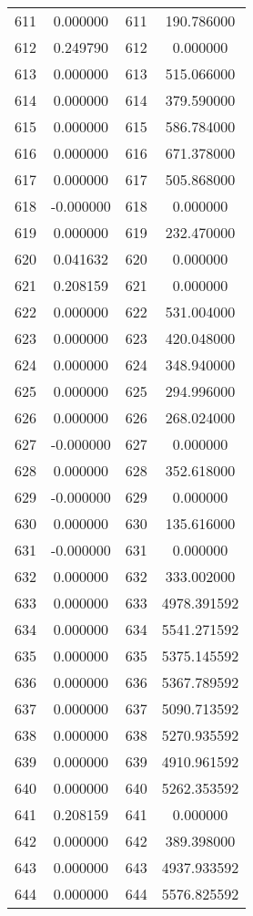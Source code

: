 \documentclass[12pt]{article}
\begin{document}
\begin{longtable}{@{}cccc@{}}
611 & 0.000000 & 611 & 190.786000 \\
612 & 0.249790 & 612 & 0.000000 \\
613 & 0.000000 & 613 & 515.066000 \\
614 & 0.000000 & 614 & 379.590000 \\
615 & 0.000000 & 615 & 586.784000 \\
616 & 0.000000 & 616 & 671.378000 \\
617 & 0.000000 & 617 & 505.868000 \\
618 & -0.000000 & 618 & 0.000000 \\
619 & 0.000000 & 619 & 232.470000 \\
620 & 0.041632 & 620 & 0.000000 \\
621 & 0.208159 & 621 & 0.000000 \\
622 & 0.000000 & 622 & 531.004000 \\
623 & 0.000000 & 623 & 420.048000 \\
624 & 0.000000 & 624 & 348.940000 \\
625 & 0.000000 & 625 & 294.996000 \\
626 & 0.000000 & 626 & 268.024000 \\
627 & -0.000000 & 627 & 0.000000 \\
628 & 0.000000 & 628 & 352.618000 \\
629 & -0.000000 & 629 & 0.000000 \\
630 & 0.000000 & 630 & 135.616000 \\
631 & -0.000000 & 631 & 0.000000 \\
632 & 0.000000 & 632 & 333.002000 \\
633 & 0.000000 & 633 & 4978.391592 \\
634 & 0.000000 & 634 & 5541.271592 \\
635 & 0.000000 & 635 & 5375.145592 \\
636 & 0.000000 & 636 & 5367.789592 \\
637 & 0.000000 & 637 & 5090.713592 \\
638 & 0.000000 & 638 & 5270.935592 \\
639 & 0.000000 & 639 & 4910.961592 \\
640 & 0.000000 & 640 & 5262.353592 \\
641 & 0.208159 & 641 & 0.000000 \\
642 & 0.000000 & 642 & 389.398000 \\
643 & 0.000000 & 643 & 4937.933592 \\
644 & 0.000000 & 644 & 5576.825592 \\

\end{longtable}
\end{document}
